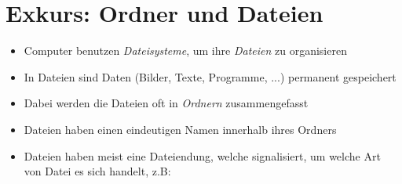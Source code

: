 \section{Exkurs: Ordner und Dateien}
\begin{frame}
    \slidehead
    \begin{itemize}[<+->]
        \item Computer benutzen \emph{Dateisysteme}, um ihre \emph{Dateien} zu organisieren
        \item In Dateien sind Daten (Bilder, Texte, Programme, ...) permanent gespeichert
        \item Dabei werden die Dateien oft in \emph{Ordnern} zusammengefasst
        \item Dateien haben einen eindeutigen Namen innerhalb ihres Ordners
        \item Dateien haben meist eine Dateiendung, welche signalisiert, um welche Art von Datei es sich handelt, z.B: 
    \end{itemize}
\end{frame}


